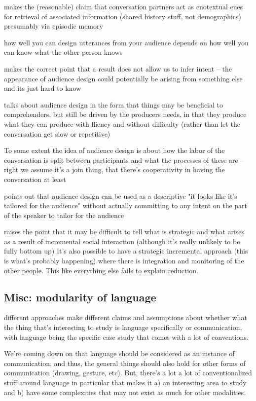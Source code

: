 \documentclass[]{article}
\begin{document}
\cite{horton2005} makes the (reasonable) claim that conversation partners act as cnotextual cues for retrieval of associated information (shared history stuff, not demographics) presumably via episodic memory 

\cite{horton2005} how well you can design utterances from your audience depends on how well you can know what the other person knows

\cite{horton1996} makes the correct point that a result does not allow us to infer intent -- the appearance of audience design could potentially be arising from something else and its just hard to know

\cite{macdonald2013} talks about audience design in the form that things may be beneficial to comprehenders, but still be driven by the producers needs, in that they produce what they can produce with fliency and without difficulty (rather than let the conversation get slow or repetitive) 

To some extent the idea of audience design is about how the labor of the conversation is split between participants and what the processes of these are -- right we assume it's a join thing, that there's cooperativity in having the conversation at least 

\cite{rogers2013} points out that audience design can be used as a descriptive "it looks like it's tailored for the audience" without actually committing to any intent on the part of the speaker to tailor for the audience 

\cite{rogers2013} raises the point that it may be difficult to tell what is strategic and what arises as a result of incremental social interaction (although it's really unlikely to be fully bottom up) It's also possible to have a strategic incremental approach (this is what's probably happening) where there is integration and monitoring of the other people. This like everything else fails to explain reduction. 

\subsection{Misc: modularity of language}
different approaches make different claims and assumptions about whether what the thing that's interesting to study is language specifically or communication, with language being the specific case study that comes with a lot of conventions. 

We're coming down on that language should be considered as an instance of communication, and thus, the general things should also hold for other forms of communication (drawing, gesture, etc). But, there's a lot a lot of conventionalized stuff around language in particular that makes it a) an interesting area to study and b) have some complexities that may not exist as much for other modalities. 
\end{document}
